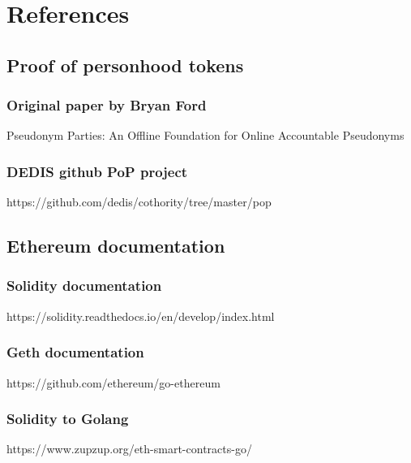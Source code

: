 \documentclass[11pt, a4paper, twoside, openright]{book} %
\begin{document}
\section{References}
\subsection{Proof of personhood tokens}
\subsubsection*{Original paper by Bryan Ford}
Pseudonym Parties: An Offline Foundation for Online Accountable Pseudonyms\\
\subsubsection*{DEDIS github PoP project}
https://github.com/dedis/cothority/tree/master/pop\\
\subsection{Ethereum documentation}
\subsubsection*{Solidity documentation}
https://solidity.readthedocs.io/en/develop/index.html
\subsubsection*{Geth documentation}
https://github.com/ethereum/go-ethereum
\subsubsection*{Solidity to Golang}
https://www.zupzup.org/eth-smart-contracts-go/
\end{document}
